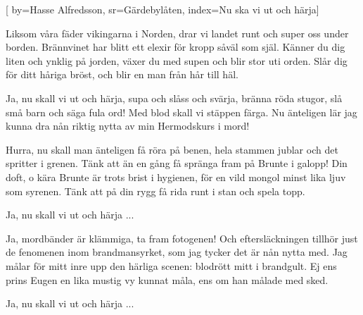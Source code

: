 [ 	
    by={Hasse Alfredsson},						
	sr={Gärdebylåten},					
	index={Nu ska vi ut och härja}]		

\beginverse*
Liksom våra fäder vikingarna i Norden,
drar vi landet runt och super oss under borden.
Brännvinet har blitt ett elexir 
för kropp såväl som själ.
Känner du dig liten och ynklig på jorden,
växer du med supen och blir stor uti orden.
Slår dig för ditt håriga bröst,
och blir en man från hår till häl.
\endverse

\beginchorus				
Ja, nu skall vi ut och härja,
supa och slåss och svärja,
bränna röda stugor, slå små barn
 och säga fula ord!
Med blod skall vi stäppen färga.
Nu änteligen lär jag
kunna dra nån riktig nytta av
min Hermodskurs i mord! 
\endchorus	

\beginverse					
Hurra, nu skall man änteligen få röra på benen,
hela stammen jublar och det spritter i grenen.
Tänk att än en gång få spränga fram
 på Brunte i galopp!
Din doft, o kära Brunte är trots brist i hygienen,
för en vild mongol minst lika ljuv som syrenen.
Tänk att på din rygg få rida runt
 i stan och spela topp. 
\endverse						

\beginchorus				
Ja, nu skall vi ut och härja ...
\endchorus	

\beginverse
Ja, mordbänder är klämmiga, ta fram fotogenen!
Och eftersläckningen tillhör just de fenomenen
inom brandmansyrket, som jag tycker 
det är nån nytta med.
Jag målar för mitt inre upp den härliga scenen: 
blodrött mitt i brandgult. Ej ens prins Eugen en
lika mustig vy kunnat måla, 
ens om han målade med sked. 
\endverse	

\beginchorus	
Ja, nu skall vi ut och härja ... 
\endchorus	

\vspace{5mm}
\endsong		
